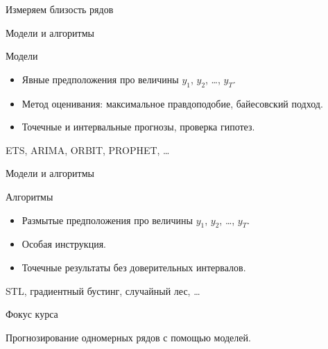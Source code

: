 \begin{frame}{Измеряем близость рядов}

  

\end{frame}



\begin{frame}{Модели и алгоритмы}

\begin{block}{Модели}
\begin{itemize}[<+->]
  \item Явные предположения про величины $y_1$, $y_2$, \ldots, $y_T$.
  \item Метод оценивания: максимальное правдоподобие, байесовский подход.
  \item Точечные и интервальные прогнозы, проверка гипотез. 
\end{itemize}
\end{block}

ETS, ARIMA, ORBIT, PROPHET, \ldots

\end{frame}

\begin{frame}{Модели и алгоритмы}

\begin{block}{Алгоритмы}
  \begin{itemize}[<+->]
    \item Размытые предположения про величины $y_1$, $y_2$, \ldots, $y_T$.
    \item Особая инструкция.
    \item Точечные результаты без доверительных интервалов. 
  \end{itemize}
\end{block}
  
STL, градиентный бустинг, случайный лес, \ldots

\end{frame}

\begin{frame}{Фокус курса}

Прогнозирование одномерных рядов с помощью моделей. 

\end{frame}



